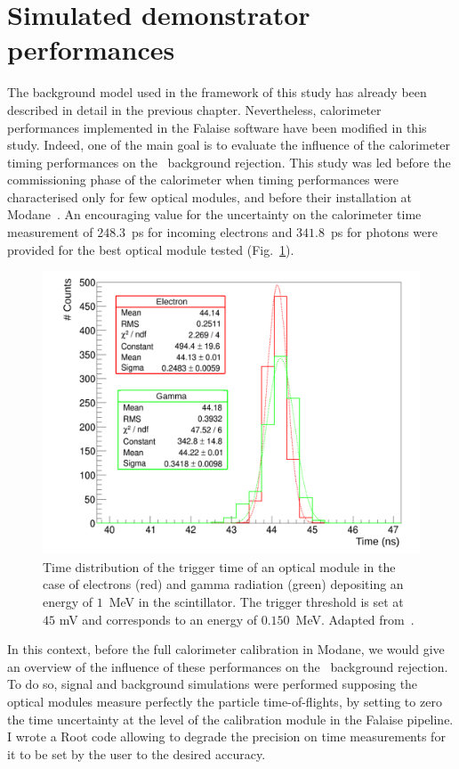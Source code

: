 \section{Simulated demonstrator performances}

The background model used in the framework of this study has already been described in detail in the previous chapter.
Nevertheless, calorimeter performances implemented in the Falaise software have been modified in this study.
Indeed, one of the main goal is to evaluate the influence of the calorimeter timing performances on the \Tl\ background rejection.
This study was led before the commissioning phase of the calorimeter when timing performances were characterised only for few optical modules, and before their installation at Modane~\cite{HuberThesis}.
An encouraging value for the uncertainty on the calorimeter time measurement of $248.3$~ps for incoming electrons and $341.8$~ps for photons were provided for the best optical module tested (Fig.~\ref{fig:Arnaud_RMS_PM}).
\begin{figure}[!h]
  \centering
  \includegraphics[width=13cm]{timedifference/fig_timediff/Arnaud_RMS_PM.pdf}
  \caption{Time distribution of the trigger time of an optical module in the case of electrons (red) and gamma radiation (green) depositing an energy of $1$~MeV in the scintillator.
    The trigger threshold is set at $45$ mV and corresponds to an energy of $0.150$~MeV.
    Adapted from~\cite{HuberThesis}.
  \label{fig:Arnaud_RMS_PM}}
\end{figure}
In this context, before the full calorimeter calibration in Modane, we would give an overview of the influence of these performances on the \Tl\ background rejection.
To do so, signal and background simulations were performed supposing the optical modules measure perfectly the particle time-of-flights, by setting to zero the time uncertainty at the level of the calibration module in the Falaise pipeline.
I wrote a Root code allowing to degrade the precision on time measurements for it to be set by the user to the desired accuracy.

